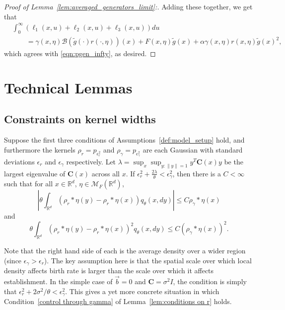 \documentclass[EJP]{ejpecp} %
\newcommand{\IR}{\mathbb R}
\newcommand{\DG}{\mathcal{B}}  %
\newcommand{\meanq}{\vec b}    %
\newcommand{\covq}{\mathbf{C}}     %
\newcommand{\kernel}{\rho}  %
\newcommand{\smooth}[1]{\kernel_{#1} \! * \!}  %
\newcommand{\measures}{\mathcal{M}_F(\IR^d)} %
\begin{document}
\begin{proof}[Proof of Lemma~\ref{lem:averaged_generators_limit}:]
Adding these together, we get that
\begin{align*}
    &
    \int_0^\infty (\ell_1(x,u) + \ell_2(x,u) + \ell_3(x,u)) du
    \\ &\qquad=
    \gamma(x,\eta) \DG(\widetilde{g}(\cdot)r(\cdot,\eta))(x)
    + F(x,\eta) \widetilde{g}(x) 
    + \alpha \gamma(x,\eta) r(x,\eta) \widetilde{g}(x)^2 ,
\end{align*}
which agrees with \eqref{eqn:pgen_infty}, as desired.
\end{proof}


\section{Technical Lemmas}

\subsection{Constraints on kernel widths}

\begin{lemma}
    \label{lem:gamma_bound}
    Suppose the first three conditions of Assumptions~\ref{def:model_setup} hold,
    and furthermore the kernels $\rho_r = p_{\epsilon_r^2}$ and $\rho_\gamma = p_{\epsilon_\gamma^2}$
    are each Gaussian with standard deviations $\epsilon_r$ and $\epsilon_\gamma$ respectively.
    Let $\lambda = \sup_x \sup_{y : \|y\| = 1} y^T \covq(x) y$ be the largest eigenvalue of $\covq(x)$
    across all $x$.
    If $\epsilon_{r}^2 + \frac{2\lambda}{\theta} < \epsilon_{\gamma}^2$, then 
    there is a $C < \infty$ such that
    for all $x\in\IR^d$, $\eta\in\measures$,
    \begin{equation}
        \label{eqn:first_moment_rho}
        \left|\theta \int_{\IR^d}
            ( \smooth{r} \eta(y)-\smooth{r} \eta(x) )
        q_\theta(x,dy)\right|
        \leq C \smooth{\gamma} \eta(x)
    \end{equation}
    and
    \begin{equation}
        \label{eqn:second_moment_rho}
        \theta \int_{\IR^d}
                \left( \smooth{r} \eta(y) - \smooth{r} \eta(x) \right)^2
        q_\theta(x,dy)
        \leq C \left(\smooth{\gamma}\eta(x) \right)^2 .
    \end{equation}
\end{lemma}

Note that the right hand side of each is the average density
over a wider region (since $\epsilon_\gamma > \epsilon_r$).
The key assumption here 
is that the spatial scale over which local density affects birth rate
is larger than the scale over which it affects establishment.
In the simple case of $\meanq = 0$ and $\covq = \sigma^2 I$,
the condition is simply that $\epsilon_r^2 + 2\sigma^2 / \theta < \epsilon_\gamma^2$.
This gives a yet more concrete situation in which 
Condition~\ref{control through gamma} of Lemma~\ref{lem:conditions on r} holds.
\end{document}
